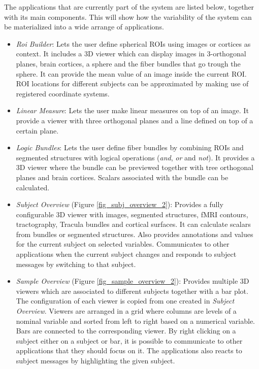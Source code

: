 The applications that are currently part of the system are listed below, together with its main components. This will show how the variability of the system can be materialized into a wide arrange of applications. 

\begin{itemize}

\item \emph{Roi Builder}: Lets the user define spherical ROIs using images or cortices as context. It includes a 3D viewer which can display images in 3-orthogonal planes, brain cortices, a sphere and the fiber bundles that go trough the sphere. It can provide the mean value of an image inside the current ROI. ROI locations for different subjects can be approximated by making use of registered coordinate systems.

\item \emph{Linear Measure}: Lets the user make linear measures on top of an image. It provide a viewer with three orthogonal planes and a line defined on top of a certain plane.

\item \emph{Logic Bundles}: Lets the user define fiber bundles by combining ROIs and segmented structures with logical operations (\emph{and}, \emph{or} and \emph{not}). It provides a 3D viewer where the bundle can be previewed together with tree orthogonal planes and brain cortices. Scalars associated with the bundle can be calculated.

\item \emph{Subject Overview} (Figure \ref{fig_subj_overview_2}): Provides a fully configurable 3D viewer with images, segmented structures, fMRI contours, tractography, Tracula bundles and cortical surfaces. It can calculate scalars from bundles or segmented structures. Also provides annotations and values for the current subject on selected variables. Communicates to other applications when the current subject changes and responds to subject messages by switching to that subject.

\item \emph{Sample Overview} (Figure \ref{fig_sample_overview_2}): Provides multiple 3D viewers which are associated to different subjects together with a bar plot. The configuration of each viewer is copied from one created in \emph{Subject Overview}. Viewers are arranged in a grid where columns are levels of a nominal variable and sorted from left to right based on a numerical variable. Bars are connected to the corresponding viewer. By right clicking on a subject either on a subject or bar, it is possible to communicate to other applications that they should focus on it. The applications also reacts to subject messages by highlighting the given subject.


\end{itemize}

